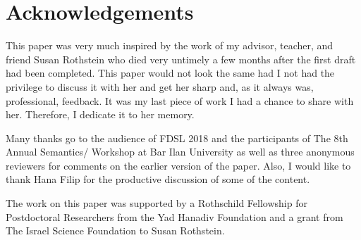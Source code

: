 \documentclass[output=paper]{langscibook}
\begin{document}
\section*{Acknowledgements}
This paper was very much inspired by the work of my advisor, teacher, and friend Susan Rothstein who died very untimely a few months after the first draft had been completed. This paper would not look the same had I not had the privilege to discuss it with her and get her sharp and, as it always was, professional, feedback. It was my last piece of work I had a chance to share with her. Therefore, I dedicate it to her memory.

Many thanks go to the audience of FDSL 2018 and the participants of The 8th Annual Semantics/ Workshop at Bar Ilan University as well as three anonymous reviewers for comments on the earlier version of the paper. Also, I would like to thank Hana Filip for the productive discussion of some of the content.

The work on this paper was supported by a Rothschild Fellowship for Postdoctoral Researchers from the Yad Hanadiv Foundation and a grant from The Israel Science Foundation to Susan Rothstein.

\sloppy
\printbibliography[heading=subbibliography,notkeyword=this]
\end{document}
